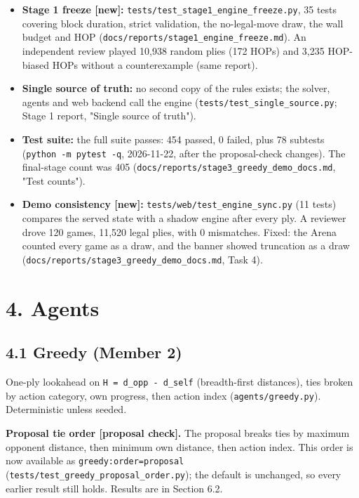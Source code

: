 \documentclass[11pt]{article}
\begin{document}
\begin{itemize}
\item \textbf{Stage 1 freeze [new]:} \texttt{tests/test\_stage1\_engine\_freeze.py}, 35 tests covering block
duration, strict validation, the no-legal-move draw, the wall budget and HOP
(\texttt{docs/reports/stage1\_engine\_freeze.md}). An independent review played 10,938 random
plies (172 HOPs) and 3,235 HOP-biased HOPs without a counterexample (same report).
\item \textbf{Single source of truth:} no second copy of the rules exists; the solver, agents and web
backend call the engine (\texttt{tests/test\_single\_source.py}; Stage 1 report, "Single source of truth").
\item \textbf{Test suite:} the full suite passes: 454 passed, 0 failed, plus 78 subtests
(\texttt{python -m pytest -q}, 2026-11-22, after the proposal-check changes). The final-stage count
was 405 (\texttt{docs/reports/stage3\_greedy\_demo\_docs.md}, "Test counts").
\item \textbf{Demo consistency [new]:} \texttt{tests/web/test\_engine\_sync.py} (11 tests) compares the served
state with a shadow engine after every ply. A reviewer drove 120 games, 11,520 legal plies,
with 0 mismatches. Fixed: the Arena counted every game as a draw, and the banner showed
truncation as a draw (\texttt{docs/reports/stage3\_greedy\_demo\_docs.md}, Task 4).
\end{itemize}

\section{4. Agents}

\subsection{4.1 Greedy (Member 2)}

One-ply lookahead on \texttt{H = d\_opp - d\_self} (breadth-first distances), ties broken by action
category, own progress, then action index (\texttt{agents/greedy.py}). Deterministic unless seeded.

\textbf{Proposal tie order [proposal check].} The proposal breaks ties by maximum opponent distance,
then minimum own distance, then action index. This order is now available as
\texttt{greedy:order=proposal} (\texttt{tests/test\_greedy\_proposal\_order.py}); the default is unchanged, so
every earlier result still holds. Results are in Section 6.2.
\end{document}
